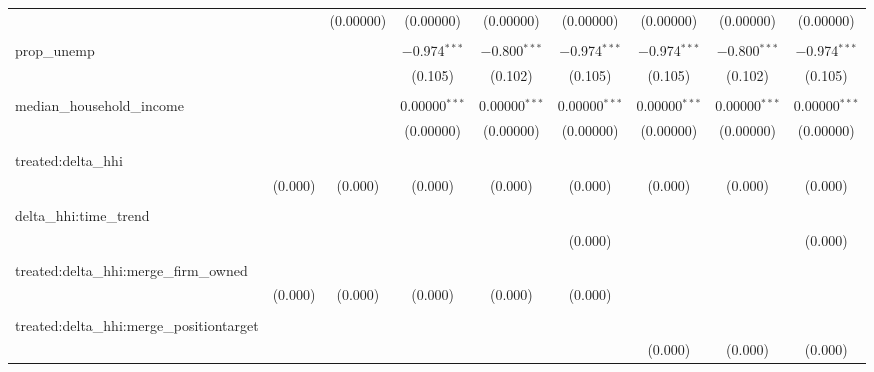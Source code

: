 \begin{table}[H]
{\begin{tabular}{@{\extracolsep{5pt}}lcccccccc}
   &  & (0.00000) & (0.00000) & (0.00000) & (0.00000) & (0.00000) & (0.00000) & (0.00000) \\  

   & & & & & & & & \\  

  prop\_unemp &  &  & $-$0.974$^{***}$ & $-$0.800$^{***}$ & $-$0.974$^{***}$ & $-$0.974$^{***}$ & $-$0.800$^{***}$ & $-$0.974$^{***}$ \\  

   &  &  & (0.105) & (0.102) & (0.105) & (0.105) & (0.102) & (0.105) \\  

   & & & & & & & & \\  

  median\_household\_income &  &  & 0.00000$^{***}$ & 0.00000$^{***}$ & 0.00000$^{***}$ & 0.00000$^{***}$ & 0.00000$^{***}$ & 0.00000$^{***}$ \\  

   &  &  & (0.00000) & (0.00000) & (0.00000) & (0.00000) & (0.00000) & (0.00000) \\  

   & & & & & & & & \\  

  treated:delta\_hhi &  &  &  &  &  &  &  &  \\  

   & (0.000) & (0.000) & (0.000) & (0.000) & (0.000) & (0.000) & (0.000) & (0.000) \\  

   & & & & & & & & \\  

  delta\_hhi:time\_trend &  &  &  &  &  &  &  &  \\  

   &  &  &  &  & (0.000) &  &  & (0.000) \\  

   & & & & & & & & \\  

  treated:delta\_hhi:merge\_firm\_owned &  &  &  &  &  &  &  &  \\  

   & (0.000) & (0.000) & (0.000) & (0.000) & (0.000) &  &  &  \\  

   & & & & & & & & \\  

  treated:delta\_hhi:merge\_positiontarget &  &  &  &  &  &  &  &  \\  

   &  &  &  &  &  & (0.000) & (0.000) & (0.000) \\  


\end{tabular}}
\end{table}
